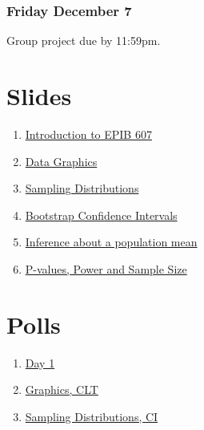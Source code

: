 \documentclass[]{book}
\providecommand{\tightlist}{%
  \setlength{\itemsep}{0pt}\setlength{\parskip}{0pt}}
\let\originaltabular\tabular
\let\endoriginaltabular\endtabular
\renewenvironment{tabular}[1]{%
  \begingroup%
  \centering%
  \originaltabular{#1}}%
  {\endoriginaltabular\endgroup}
\providecommand{\tightlist}{%
  \setlength{\itemsep}{0pt}\setlength{\parskip}{0pt}}
\theoremstyle{definition}
\theoremstyle{definition}
\theoremstyle{definition}
\theoremstyle{remark}
\begin{document}
\subsection{Friday December 7}\label{friday-december-7}

\begin{table}[H]
\centering
\begin{tabular}{l}
\hline
Group project due by 11:59pm.\\
\hline
\end{tabular}
\end{table}

\chapter{Slides}\label{slides}

\begin{enumerate}
\def\labelenumi{\arabic{enumi}.}
\tightlist
\item
  \href{https://docs.google.com/presentation/d/15c0YIS2KJXFzTKgFfQ_xDjTAcvPyQb8JhSLGvsEHJ6o/edit?usp=sharing}{Introduction
  to EPIB 607}
\item
  \href{https://docs.google.com/presentation/d/1wXgcTzcRKl_leGRfNZjWWPkjwJSTlZSXBCl-fFuLEaE/edit?usp=sharing}{Data
  Graphics}
\item
  \href{https://github.com/sahirbhatnagar/EPIB607/raw/master/slides/sampling_dist/EPIB607_sampling_dist.pdf}{Sampling
  Distributions}
\item
  \href{https://github.com/sahirbhatnagar/EPIB607/raw/master/slides/bootstrap/EPIB607_bootstrap.pdf}{Bootstrap
  Confidence Intervals}
\item
  \href{https://github.com/sahirbhatnagar/EPIB607/raw/master/slides/one_sample_mean/EPIB607_one_sample_mean.pdf}{Inference
  about a population mean}
\item
  \href{https://github.com/sahirbhatnagar/EPIB607/raw/master/slides/sample_size/EPIB607_sample_size.pdf}{P-values,
  Power and Sample Size}
\end{enumerate}

\chapter{Polls}\label{polls}

\begin{enumerate}
\def\labelenumi{\arabic{enumi}.}
\tightlist
\item
  \href{https://github.com/sahirbhatnagar/EPIB607/raw/master/polls/001_day1_basic_concepts/001-day1.pdf}{Day
  1}
\item
  \href{https://github.com/sahirbhatnagar/EPIB607/raw/master/polls/002_viz_hist_clt/002-viz-hist-clt.pdf}{Graphics,
  CLT}
\item
  \href{https://github.com/sahirbhatnagar/EPIB607/raw/master/polls/003_sampling_dist_CI/003-sampling-dist-CI.pdf}{Sampling
  Distributions, CI}
\end{enumerate}
\end{document}
